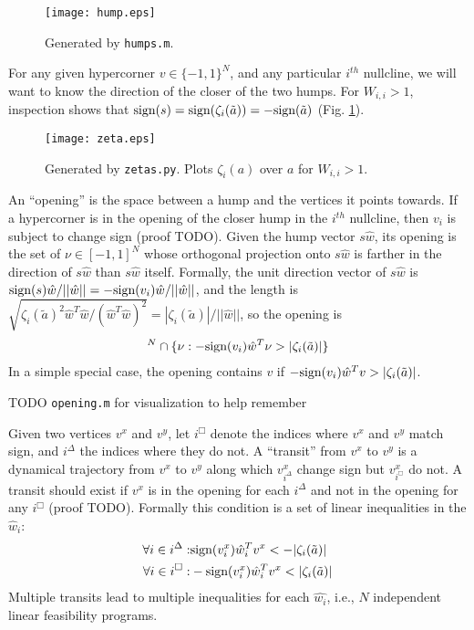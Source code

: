 \documentclass[pdftex,12pt,letterpaper]{article}
\newcommand{\sign}{\text{\upshape{sign}}}
\begin{document}
\begin{figure}
\centering
\texttt{[image: hump.eps]}
\caption{Generated by \texttt{humps.m}.}
\end{figure}

For any given hypercorner $v \in \{-1,1\}^N$, and any particular $i^{th}$ nullcline, we will want to know the direction of the closer of the two humps.  For $W_{i,i}>1$, inspection shows that $\sign(s) = \sign(\zeta_i(\tilde{a})) = -\sign(\tilde{a})$ (Fig. \ref{fig:zeta}).

\begin{figure}
\centering
\texttt{[image: zeta.eps]}
\caption{Generated by \texttt{zetas.py}. Plots $\zeta_i(a)$ over $a$ for $W_{i,i}>1$.}
\label{fig:zeta}
\end{figure}

An ``opening'' is the space between a hump and the vertices it points towards.  If a hypercorner is in the opening of the closer hump in the $i^{th}$ nullcline, then $v_i$ is subject to change sign (proof TODO).  Given the hump vector $s\hat{w}$, its opening is the set of $\nu\in[-1,1]^N$ whose orthogonal projection onto $s\hat{w}$ is farther in the direction of $s\hat{w}$ than $s\hat{w}$ itself. Formally, the unit direction vector of $s\hat{w}$ is $\sign(s)\hat{w}/||\hat{w}|| = -\sign(v_i)\hat{w}/||\hat{w}||$, and the length is $\sqrt{\zeta_i(\tilde{a})^2\hat{w}^T\hat{w}/(\hat{w}^T\hat{w})^2} = |\zeta_i(\tilde{a})|/||\hat{w}||$, so the opening is
\begin{align}
[-1,1]^N \cap \{\nu : -\sign(v_i)\hat{w}^T\nu > |\zeta_i(\tilde{a})| \}
\end{align}
In a simple special case, the opening contains $v$ if $-\sign(v_i)\hat{w}^Tv > |\zeta_i(\tilde{a})|$.

TODO \texttt{opening.m} for visualization to help remember

Given two vertices $v^x$ and $v^y$, let $i^\Box$ denote the indices where $v^x$ and $v^y$ match sign, and $i^\Delta$ the indices where they do not.  A ``transit'' from $v^x$ to $v^y$ is a dynamical trajectory from $v^x$ to $v^y$ along which $v^x_{i^\Delta}$ change sign but $v^x_{i^\Box}$ do not.  A transit should exist if $v^x$ is in the opening for each $i^\Delta$ and not in the opening for any $i^\Box$ (proof TODO).  Formally this condition is a set of linear inequalities in the $\hat{w}_i$:
\begin{align}
\forall i\in i^\Delta:& \sign(v^x_i)\hat{w}^T_iv^x < -|\zeta_i(\tilde{a})| \\
\forall i\in i^\Box:& -\sign(v^x_i)\hat{w}^T_iv^x < |\zeta_i(\tilde{a})| \\
\end{align}
Multiple transits lead to multiple inequalities for each $\hat{w_i}$, i.e., $N$ independent linear feasibility programs.
\end{document}
